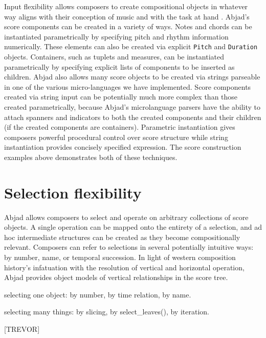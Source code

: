 \documentclass{article}
\begin{document}
Input flexibility allows composers to create compositional objects in whatever
way aligns with their conception of music and with the task at hand
\cite{Kay:1996vn}. Abjad's score components can be created in a variety of
ways. Notes and chords can be instantiated parametrically by specifying
pitch and rhythm information numerically. These elements can also be created via
explicit \texttt{Pitch} and \texttt{Duration} objects. Containers, such as
tuplets and measures, can be instantiated parametrically by specifying explicit
lists of components to be inserted as children. Abjad also allows many score
objects to be created via strings parseable in one of the various
micro-languages we have implemented. Score components created via string input
can be potentially much more complex than those created parametrically, because
Abjad's microlanguage parsers have the ability to attach spanners and
indicators to both the created components and their children (if the created
components are containers). Parametric instantiation gives composers powerful
procedural control over score structure while string instantiation provides
concisely specified expression. The score construction examples above
demonstrates both of these techniques.

\section{Selection flexibility} \label{sec:selection-flexibility}

Abjad allows composers to select and operate on arbitrary collections of score
objects. A single operation can be mapped onto the entirety of a selection, and
ad hoc intermediate structures can be created as they become compositionally
relevant. Composers can refer to selections in several potentially intuitive
ways: by number, name, or temporal succession. In light of western composition
history's infatuation with the resolution of vertical and horizontal operation,
Abjad provides object models of vertical relationships in the score tree.

selecting one object: by number, by time relation, by name.

selecting many things: by slicing, by select\_leaves(), by iteration.

[TREVOR]

\end{document}
